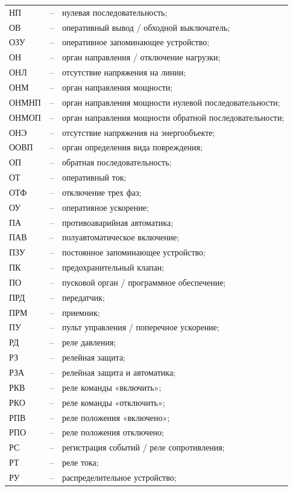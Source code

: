 \begin{longtable}{>{\raggedright\arraybackslash}m{2cm}>{\raggedright\arraybackslash}m{0.5cm}>{\raggedright\arraybackslash}m{20cm}}
НП & -- & нулевая последовательность; \\
ОВ & -- & оперативный вывод / обходной выключатель; \\
ОЗУ & -- & оперативное запоминающее устройство; \\
ОН & -- & орган направления / отключение нагрузки; \\
ОНЛ & -- & отсутствие напряжения на линии; \\
ОНМ & -- & орган направления мощности; \\
ОНМНП & -- & орган направления мощности нулевой последовательности; \\
ОНМОП & -- & орган направления мощности обратной последовательности; \\
ОНЭ & -- & отсутствие напряжения на энергообъекте; \\
ООВП & -- & орган определения вида повреждения; \\
ОП & -- & обратная последовательность; \\
ОТ & -- & оперативный ток; \\
ОТФ & -- & отключение трех фаз; \\
ОУ & -- & оперативное ускорение; \\
ПА & -- & противоаварийная автоматика; \\
ПАВ & -- & полуавтоматическое включение; \\
ПЗУ & -- & постоянное запоминающее устройство; \\
ПК & -- & предохранительный клапан; \\
ПО & -- & пусковой орган / программное обеспечение; \\
ПРД & -- & передатчик; \\
ПРМ & -- & приемник; \\
ПУ & -- & пульт управления / поперечное ускорение; \\
РД & -- & реле давления; \\
РЗ & -- & релейная защита; \\
РЗА & -- & релейная защита и автоматика; \\
РКВ & -- & реле команды «включить»; \\
РКО & -- & реле команды «отключить»; \\
РПВ & -- & реле положения «включено»; \\
РПО & -- & реле положения отключено; \\
РС & -- & регистрация событий / реле сопротивления; \\
РТ & -- & реле тока; \\
РУ & -- & распределительное устройство; \\

\end{longtable}
